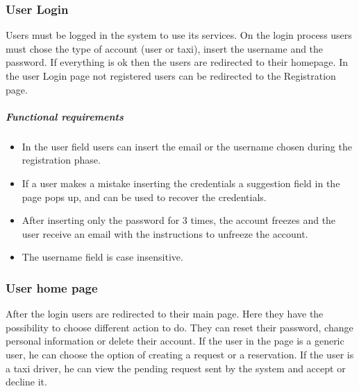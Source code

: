 \subsubsection{User Login}
Users must be logged in the system to use its services.
On the login process users must chose the type of account (user or taxi), insert the username and the password. If everything is ok then the users are redirected to their homepage.
In the user Login page not registered users can be redirected to the Registration page.

	\subparagraph{Functional requirements}
	\noindent
		\begin{itemize}
			\item In the user field users can insert the email or the username chosen during the registration phase.
			\item If a user makes a mistake inserting the credentials a suggestion field in the page pops up, and can be used to recover the credentials.
			\item After inserting only the password for 3 times, the account freezes and the user receive an email with the instructions to unfreeze the account.
			\item The username field is case insensitive.
			
		\end{itemize}

\subsubsection{User home page}  
After the login users are redirected to their main page. Here they have the possibility to choose different action to do.
They can reset their password, change personal information or delete their account.
If the user in the page is a generic user, he can choose the option of creating a request or a reservation.
If the user is a taxi driver, he can view the pending request sent by the system and accept or decline it.

